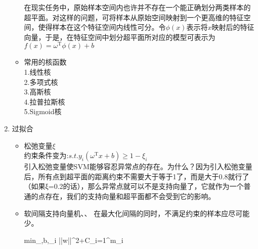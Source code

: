 \begin{enumerate}
\begin{itemize}
		在现实任务中，原始样本空间内也许并不存在一个能正确划分两类样本的超平面。对这样的问题，可将样本从原始空间映射到一个更高维的特征空间，使得样本在这个特征空间内线性可分。令$\phi(x)$表示将$x$映射后的特征向量，于是，在特征空间中划分超平面所对应的模型可表示为$f(x)=\omega^\mathrm{T}\phi(x)+b$
		\item 常用的核函数\\
		1.线性核\\
		2.多项式核\\
		3.高斯核\\
		4.拉普拉斯核\\
		5.Sigmoid核\\
	\end{itemize}
	\item 过拟合
	\begin{itemize}
		\item 松弛变量$\xi$\\
		约束条件变为:$s.t. y_i(\omega^\mathrm{T}x+b)\geq 1-\xi_i$\\
		引入松弛变量使SVM能够容忍异常点的存在。为什么？因为引入松弛变量后，所有点到超平面的距离约束不需要大于等于1了，而是大于0.8就行了（如果ξ=0.2的话），那么异常点就可以不是支持向量了，它就作为一个普通的点存在，我们的支持向量和超平面都不会受到它的影响。
		\item 软间隔支持向量机、、
		在最大化间隔的同时，不满足约束的样本应尽可能少。
		\begin{flalign}
			min_{\omega,b,\xi_i}  ||w||^{2}+C\sum_{i=1}^{m}\xi_i
		\end{flalign}	
	\end{itemize}
\end{enumerate}
